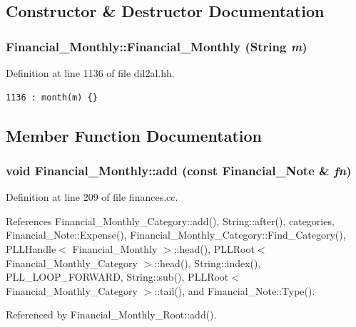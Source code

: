 \subsection{Constructor \& Destructor Documentation}
\subsubsection{\setlength{\rightskip}{0pt plus 5cm}Financial\_\-Monthly::Financial\_\-Monthly ({\bf String} {\em m})\hspace{0.3cm}{\tt  [inline]}}\label{classFinancial__Monthly_a0}




Definition at line 1136 of file dil2al.hh.



\footnotesize\begin{verbatim}1136 : month(m) {}
\end{verbatim}\normalsize 


\subsection{Member Function Documentation}
\subsubsection{\setlength{\rightskip}{0pt plus 5cm}void Financial\_\-Monthly::add (const {\bf Financial\_\-Note} \& {\em fn})}\label{classFinancial__Monthly_a4}




Definition at line 209 of file finances.cc.

References Financial\_\-Monthly\_\-Category::add(), String::after(), categories, Financial\_\-Note::Expense(), Financial\_\-Monthly\_\-Category::Find\_\-Category(), PLLHandle$<$ Financial\_\-Monthly $>$::head(), PLLRoot$<$ Financial\_\-Monthly\_\-Category $>$::head(), String::index(), PLL\_\-LOOP\_\-FORWARD, String::sub(), PLLRoot$<$ Financial\_\-Monthly\_\-Category $>$::tail(), and Financial\_\-Note::Type().

Referenced by Financial\_\-Monthly\_\-Root::add().




